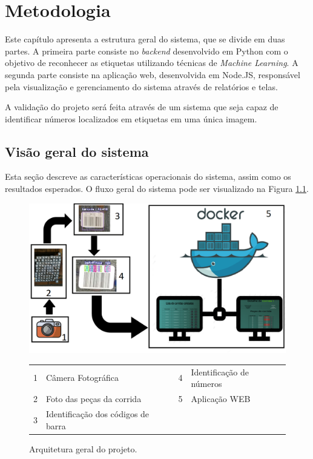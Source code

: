  \chapter{Metodologia}
 
Este capítulo apresenta a estrutura geral do sistema, que se divide em duas partes. A primeira parte consiste no \textit{backend} desenvolvido em Python com o objetivo de reconhecer as etiquetas utilizando técnicas de \textit{Machine Learning}. A segunda parte consiste na aplicação web, desenvolvida em Node.JS, responsável pela visualização e gerenciamento do sistema através de relatórios e telas.

A validação do projeto será feita através de um sistema que seja capaz de identificar números localizados em etiquetas em uma única imagem.


\section{Visão geral do sistema} \label{sec:funcionamento}

Esta seção descreve as características operacionais do sistema, assim como os resultados esperados. O fluxo geral do sistema pode ser visualizado na Figura \ref{fig:arqgeral}.

\begin{figure}[htbp]
	\centering
	\includegraphics[width=1\linewidth]{capitulos/FluxoDoProjeto.png}
	\caption{Arquitetura geral do projeto.}
	\begin{tabular}{r@{: }l r@{: }l}
    1 & Câmera Fotográfica & 4 & Identificação de números \\
    2& Foto das peças da corrida & 5 & Aplicação WEB \\
    3 & Identificação dos códigos de  barra
    \end{tabular}
	\label{fig:arqgeral}
\end{figure}

